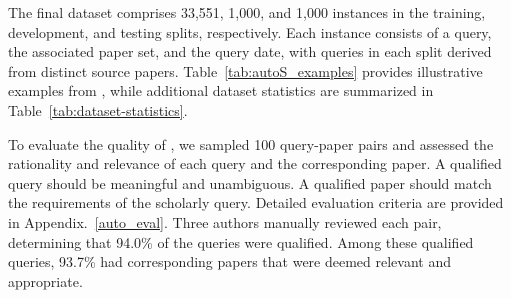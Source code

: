 The final \autoS dataset comprises 33,551, 1,000, and 1,000 instances in the training, development, and testing splits, respectively. Each instance consists of a query, the associated paper set, and the query date, with queries in each split derived from distinct source papers. Table~\ref{tab:autoS_examples} provides illustrative examples from \autoS, while additional dataset statistics are summarized in Table~\ref{tab:dataset-statistics}.

To evaluate the quality of \autoS, we sampled 100 query-paper pairs and assessed the rationality and relevance of each query and the corresponding paper. A qualified query should be meaningful and unambiguous. A qualified paper should match the requirements of the scholarly query. Detailed evaluation criteria are provided in Appendix.~\ref{auto_eval}. Three authors manually reviewed each pair, determining that 94.0\% of the queries were qualified. Among these qualified queries, 93.7\% had corresponding papers that were deemed relevant and appropriate.

